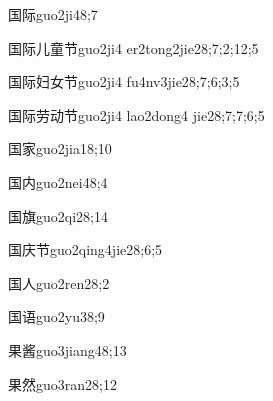 \begin{verbete}{国际}{guo2ji4}{8;7}
\end{verbete}

\begin{verbete}{国际儿童节}{guo2ji4 er2tong2jie2}{8;7;2;12;5}
\end{verbete}

\begin{verbete}{国际妇女节}{guo2ji4 fu4nv3jie2}{8;7;6;3;5}
\end{verbete}

\begin{verbete}{国际劳动节}{guo2ji4 lao2dong4 jie2}{8;7;7;6;5}
\end{verbete}

\begin{verbete}{国家}{guo2jia1}{8;10}
\end{verbete}

\begin{verbete}{国内}{guo2nei4}{8;4}
\end{verbete}

\begin{verbete}{国旗}{guo2qi2}{8;14}
\end{verbete}

\begin{verbete}{国庆节}{guo2qing4jie2}{8;6;5}
\end{verbete}

\begin{verbete}{国人}{guo2ren2}{8;2}
\end{verbete}

\begin{verbete}{国语}{guo2yu3}{8;9}
\end{verbete}

\begin{verbete}{果酱}{guo3jiang4}{8;13}
\end{verbete}

\begin{verbete}{果然}{guo3ran2}{8;12}
\end{verbete}


